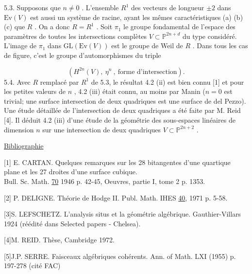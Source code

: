 5.3. \quad Supposons que $n \neq 0$ . L'ensemble $R^1$ des vecteurs de longueur $\pm 2$ dans $\mathrm{Ev}(V)$ est aussi un système de racine, ayant les mêmes caractéristiques (a) (b) (c) que $R$ . On a donc $R = R^1$ . Soit $\pi_1$ le groupe fondamental de l'espace des paramètres de toutes les intersections complètes $V \subset \mathbb{P}^{2n+d}$ du type considéré. L'image de $\pi_1$ dans $\mathrm{GL}(\mathrm{Ev}(V))$ est le groupe de Weil de $R$ . Dans tous les cas de figure, c'est le groupe d'automorphismes du triple

\begin{equation*}
(H^{2n}(V),\ \eta^n\ ,\ \mbox{forme d'intersection}).
\end{equation*}
5.4. \quad Avec $R$ remplacé par $R^1$ de 5.3, le résultat 4.2 (ii) est bien connu [1] et pour les petites valeurs de $n$ , 4.2 (iii) était connu, au moins par Manin ($n = 0$ est trivial; une surface intersection de deux quadriques est une surface de del Pezzo). Une étude détaillée de l'intersection de deux quadriques a été faite par M. Reid [4]. Il déduit 4.2 (iii) d'une étude de la géométrie des sous-espaces linéaires de dimension $n$ sur une intersection de deux quadriques $V \subset \mathbb{P}^{2n+2}$ .


\underline{Bibliographie}

[1] \quad E. CARTAN. Quelques remarques sur les 28 bitangentes d'une quartique plane et les 27 droites d'une surface cubique.\\ Bull. Sc. Math. \underline{70} 1946 p. 42-45, Oeuvres, partie I, tome 2 p. 1353.

[2] \quad P. DELIGNE. Théorie de Hodge II. Publ. Math. IHES \underline{40}, 1971 p. 5-58.



[3]\quad S. LEFSCHETZ. L'analysis situs et la géométrie algébrique. Gauthier-Villars 1924 (réédité dans Selected papers - Chelsea).

[4]\quad M. REID. Thèse, Cambridge 1972.

[5]\quad J.P. SERRE. Faisceaux algébriques cohérents. Ann. of Math. LXI (1955) p. 197-278 (cité FAC)
